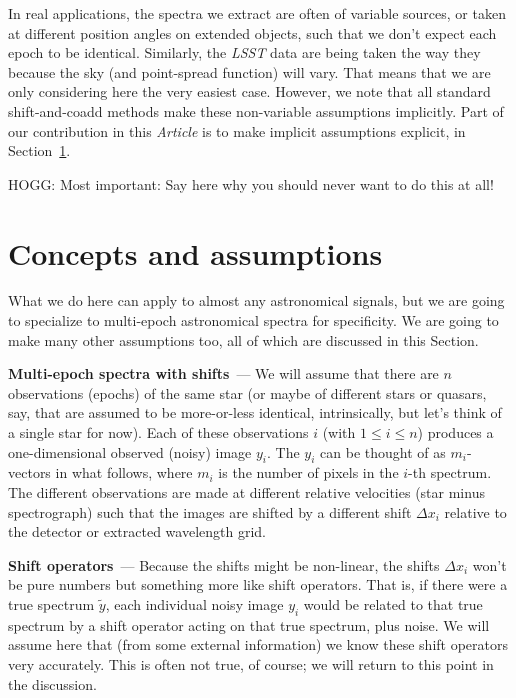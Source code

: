 \documentclass[modern]{aastex631}
\renewcommand{\paragraph}[1]{\medskip\par\noindent\textbf{#1}~---}
\newcommand{\documentname}{\textsl{Article}}
\newcommand{\sectionname}{Section}
\begin{document}
In real applications, the spectra we extract are often of variable sources, or taken at different position angles on extended objects, such that we don't expect each epoch to be identical.
Similarly, the \textsl{LSST} data are being taken the way they because the sky (and point-spread function) will vary.
That means that we are only considering here the very easiest case.
However, we note that all standard shift-and-coadd methods make these non-variable assumptions implicitly.
Part of our contribution in this \documentname{} is to make implicit assumptions explicit, in \sectionname~\ref{sec:assumptions}.

HOGG: Most important: Say here why you should never want to do this at all! %

\section{Concepts and assumptions}\label{sec:assumptions}

What we do here can apply to almost any astronomical signals, but we are going to specialize to multi-epoch astronomical spectra for specificity.
We are going to make many other assumptions too, all of which are discussed in this \sectionname.

\paragraph{Multi-epoch spectra with shifts}
We will assume that there are $n$ observations (epochs) of the same star (or maybe of different stars or quasars, say, that are assumed to be more-or-less identical, intrinsically, but let's think of a single star for now).
Each of these observations $i$ (with $1\leq i\leq n$) produces a one-dimensional observed (noisy) image $y_i$.
The $y_i$ can be thought of as $m_i$-vectors in what follows, where $m_i$ is the number of pixels in the $i$-th spectrum.
The different observations are made at different relative velocities (star minus spectrograph) such that the images are shifted by a different shift $\Delta x_i$ relative to the detector or extracted wavelength grid.

\paragraph{Shift operators}
Because the shifts might be non-linear, the shifts $\Delta x_i$ won't be pure numbers but something more like shift operators.
That is, if there were a true spectrum $\tilde{y}$, each individual noisy image $y_i$ would be related to that true spectrum by a shift operator acting on that true spectrum, plus noise.
We will assume here that (from some external information) we know these shift operators very accurately.
This is often not true, of course; we will return to this point in the discussion.
\end{document}
